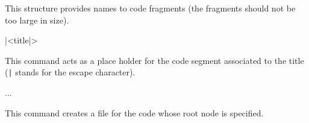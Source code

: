 This structure provides names to code fragments (the fragments should not be too large in size).


\begin{texsource}
 |<title|>
 \end{texsource}

 This command acts as a place holder for the code segment associated to the title (\texttt{|} stands for the escape character). 

\begin{texsource}
   \OutputCode\<...\>
 \end{texsource}

This command creates a file for the code whose root node is specified.



